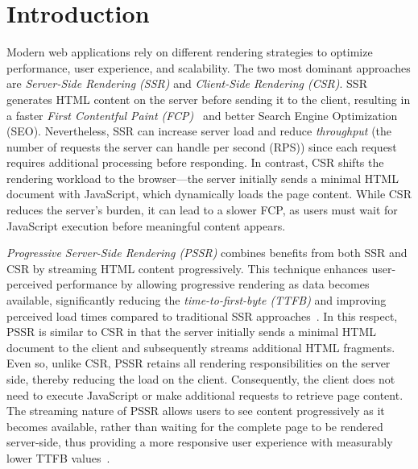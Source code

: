 \documentclass[software,article,accept,pdftex,moreauthors]{Definitions/mdpi}
\begin{document}

\section{Introduction}


Modern web applications rely on different rendering strategies to optimize
performance, user experience, and scalability. The two most dominant
approaches are \textit{Server-Side Rendering (SSR)} and \textit{Client-Side Rendering (CSR)}. SSR generates HTML content on the server before sending it to the client, resulting in a faster \textit{First Contentful Paint (FCP)}~\cite{Edgar2024-FCP} and better Search Engine Optimization (SEO). Nevertheless, SSR
can increase server load and reduce \textit{throughput}
(the number of requests the server can handle per second (RPS)) since each request requires
additional processing before responding. In contrast, CSR shifts the rendering
workload to the browser---the server initially sends a minimal HTML document with
JavaScript, which dynamically loads the page content. While CSR reduces the
server’s burden, it can lead to a slower FCP, as users must wait for
JavaScript execution before meaningful content appears.

\textit{Progressive Server-Side Rendering (PSSR)} combines benefits from both SSR and CSR
by streaming HTML content progressively. This technique enhances user-perceived performance by
allowing progressive rendering as data becomes available, significantly reducing the
\textit{time-to-first-byte (TTFB)} and improving perceived load times compared to traditional
SSR approaches~\cite{wise2024pssr}. In this respect,
PSSR is similar to CSR in that the server initially sends a minimal HTML
document to the client and subsequently streams additional HTML fragments.
Even so, unlike CSR, PSSR retains all rendering responsibilities on the server side,
thereby reducing the load on the client. Consequently, the client does
not need to execute JavaScript or make additional requests to retrieve page content.
The streaming nature of PSSR allows users to see content progressively as it becomes
available, rather than waiting for the complete page to be rendered server-side,
thus providing a more responsive user experience with measurably lower TTFB values~\cite{wise2024pssr}.
\end{document}
